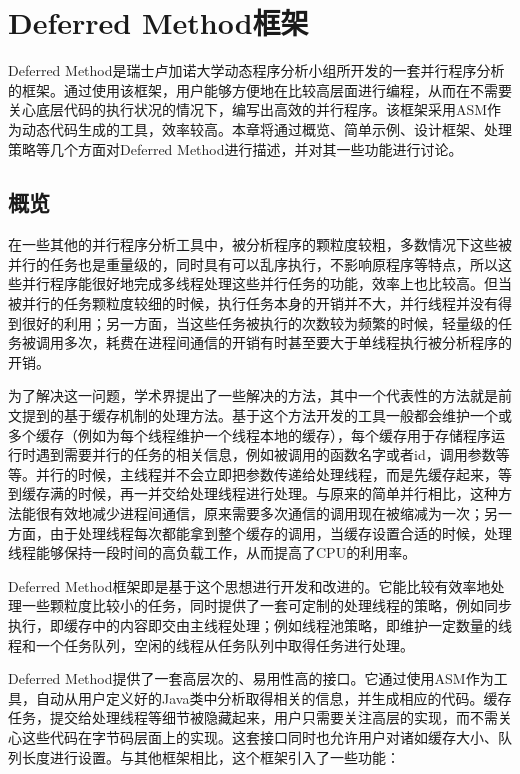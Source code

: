 
\chapter{Deferred Method框架}

Deferred Method是瑞士卢加诺大学动态程序分析小组所开发的一套并行程序分析的框架。通过使用该框架，用户能够方便地在比较高层面进行编程，从而在不需要关心底层代码的执行状况的情况下，编写出高效的并行程序。该框架采用ASM作为动态代码生成的工具，效率较高。本章将通过概览、简单示例、设计框架、处理策略等几个方面对Deferred Method进行描述，并对其一些功能进行讨论。

\section{概览}

在一些其他的并行程序分析工具中，被分析程序的颗粒度较粗，多数情况下这些被并行的任务也是重量级的，同时具有可以乱序执行，不影响原程序等特点，所以这些并行程序能很好地完成多线程处理这些并行任务的功能，效率上也比较高。但当被并行的任务颗粒度较细的时候，执行任务本身的开销并不大，并行线程并没有得到很好的利用；另一方面，当这些任务被执行的次数较为频繁的时候，轻量级的任务被调用多次，耗费在进程间通信的开销有时甚至要大于单线程执行被分析程序的开销。

为了解决这一问题，学术界提出了一些解决的方法，其中一个代表性的方法就是前文提到的基于缓存机制的处理方法。基于这个方法开发的工具一般都会维护一个或多个缓存（例如为每个线程维护一个线程本地的缓存），每个缓存用于存储程序运行时遇到需要并行的任务的相关信息，例如被调用的函数名字或者id，调用参数等等。并行的时候，主线程并不会立即把参数传递给处理线程，而是先缓存起来，等到缓存满的时候，再一并交给处理线程进行处理。与原来的简单并行相比，这种方法能很有效地减少进程间通信，原来需要多次通信的调用现在被缩减为一次；另一方面，由于处理线程每次都能拿到整个缓存的调用，当缓存设置合适的时候，处理线程能够保持一段时间的高负载工作，从而提高了CPU的利用率。

Deferred Method框架即是基于这个思想进行开发和改进的。它能比较有效率地处理一些颗粒度比较小的任务，同时提供了一套可定制的处理线程的策略，例如同步执行，即缓存中的内容即交由主线程处理；例如线程池策略，即维护一定数量的线程和一个任务队列，空闲的线程从任务队列中取得任务进行处理。

Deferred Method提供了一套高层次的、易用性高的接口。它通过使用ASM作为工具，自动从用户定义好的Java类中分析取得相关的信息，并生成相应的代码。缓存任务，提交给处理线程等细节被隐藏起来，用户只需要关注高层的实现，而不需关心这些代码在字节码层面上的实现。这套接口同时也允许用户对诸如缓存大小、队列长度进行设置。与其他框架相比，这个框架引入了一些功能：

